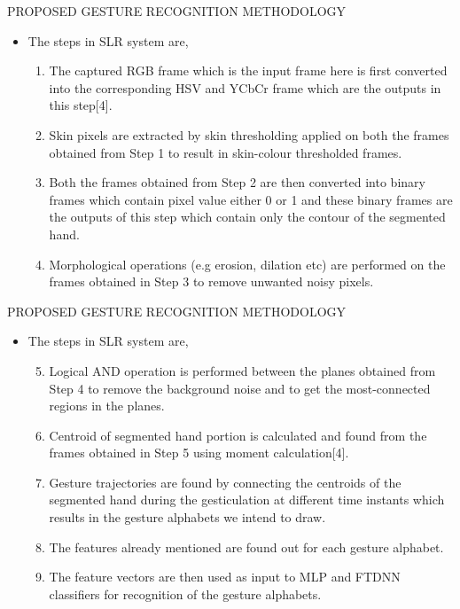 \documentclass{beamer}
\begin{document}
\begin{frame}{PROPOSED GESTURE RECOGNITION
METHODOLOGY}
\begin{itemize}
\item The steps in SLR system are,

\begin{enumerate}


\item The captured RGB frame which is the input frame
here is first converted into the corresponding HSV and YCbCr
frame which are the outputs in this step[4].
\item Skin pixels are extracted by skin thresholding
applied on both the frames obtained from Step 1 to result in
skin-colour thresholded frames.
\item Both the frames obtained from Step 2 are then
converted into binary frames which contain pixel value either
0 or 1 and these binary frames are the outputs of this step
which contain only the contour of the segmented hand.
\item Morphological operations (e.g erosion, dilation etc)
are performed on the frames obtained in Step 3 to remove
unwanted noisy pixels.
\end{enumerate}
\end{itemize}
\end{frame}


\begin{frame}{PROPOSED GESTURE RECOGNITION
METHODOLOGY}
\begin{itemize}
\item The steps in SLR system are,
\begin{enumerate}
\setcounter{enumi}{4}
\item Logical AND operation is performed between the
planes obtained from Step 4 to remove the background noise
and to get the most-connected regions in the planes.
\item Centroid of segmented hand portion is calculated
and found from the frames obtained in Step 5 using moment
calculation[4].
\item Gesture trajectories are found by connecting the
centroids of the segmented hand during the gesticulation at
different time instants which results in the gesture alphabets
we intend to draw.
\item The features already mentioned are found out for
each gesture alphabet.
\item The feature vectors are then used as input to MLP
and FTDNN classifiers for recognition of the gesture alphabets.
\end{enumerate}
\end{itemize}


\end{frame}
\end{document}
